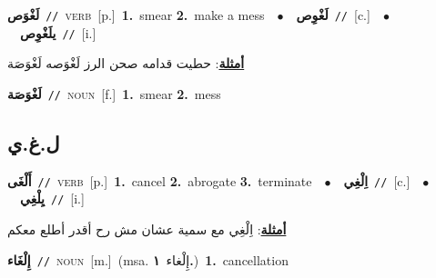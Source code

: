 \documentclass[10pt,a4paper,twoside]{article} %
\begin{document}
\begin{multicols}{2}
{\setlength\topsep{0pt}\textbf{\foreignlanguage{arabic}{لَغْوَص}}\ {\color{gray}\texttt{//}\color{black}}\ \textsc{verb}\ [p.]\ \textbf{1.}~smear  \textbf{2.}~make a mess\ \ $\bullet$\ \ \setlength\topsep{0pt}\textbf{\foreignlanguage{arabic}{لَغْوِص}}\ {\color{gray}\texttt{//}\color{black}}\ [c.]\ \ $\bullet$\ \ \setlength\topsep{0pt}\textbf{\foreignlanguage{arabic}{يلَغْوِص}}\ {\color{gray}\texttt{//}\color{black}}\ [i.]\  \begin{flushright}\color{gray}\foreignlanguage{arabic}{\textbf{\underline{\foreignlanguage{arabic}{أمثلة}}}: حطيت قدامه صحن الرز لَغْوَصه لَغْوَصَة}\end{flushright}\color{black}} \vspace{2mm}

{\setlength\topsep{0pt}\textbf{\foreignlanguage{arabic}{لَغْوَصَة}}\ {\color{gray}\texttt{//}\color{black}}\ \textsc{noun}\ [f.]\ \textbf{1.}~smear  \textbf{2.}~mess\ } \vspace{2mm}

\vspace{-3mm}
\subsection*{\color{blue}\foreignlanguage{arabic}{ل.غ.ي}\color{blue}{}} 

{\setlength\topsep{0pt}\textbf{\foreignlanguage{arabic}{أَلْغَى}}\ {\color{gray}\texttt{//}\color{black}}\ \textsc{verb}\ [p.]\ \textbf{1.}~cancel  \textbf{2.}~abrogate  \textbf{3.}~terminate\ \ $\bullet$\ \ \setlength\topsep{0pt}\textbf{\foreignlanguage{arabic}{اِلْغِي}}\ {\color{gray}\texttt{//}\color{black}}\ [c.]\ \ $\bullet$\ \ \setlength\topsep{0pt}\textbf{\foreignlanguage{arabic}{يِلْغِي}}\ {\color{gray}\texttt{//}\color{black}}\ [i.]\  \begin{flushright}\color{gray}\foreignlanguage{arabic}{\textbf{\underline{\foreignlanguage{arabic}{أمثلة}}}: اِلْغِي مع سمية عشان مش رح أقدر أطلع معكم}\end{flushright}\color{black}} \vspace{2mm}

{\setlength\topsep{0pt}\textbf{\foreignlanguage{arabic}{إِلْغَاء}}\ {\color{gray}\texttt{//}\color{black}}\ \textsc{noun}\ [m.]\ \color{gray}(msa. \foreignlanguage{arabic}{إِلْغاء}~\foreignlanguage{arabic}{\textbf{١.}})\color{black}\ \textbf{1.}~cancellation\ } \vspace{2mm}


\end{multicols}
\end{document}
